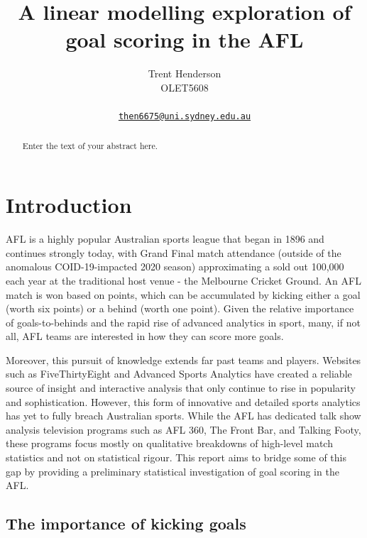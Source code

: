 \documentclass{article}
\title{A linear modelling exploration of goal scoring in the AFL}
\author{
    Trent Henderson
   \\
    OLET5608 \\
   \\
  \texttt{\href{mailto:then6675@uni.sydney.edu.au}{\nolinkurl{then6675@uni.sydney.edu.au}}} \\
  }
\begin{document}
\maketitle

\def\tightlist{}


\begin{abstract}
Enter the text of your abstract here.
\end{abstract}


\setlength{\abovedisplayskip}{-15pt}
\setlength{\belowdisplayskip}{0pt}
\setlength{\abovedisplayshortskip}{0pt}
\setlength{\belowdisplayshortskip}{0pt}

\hypertarget{introduction}{%
\section{Introduction}\label{introduction}}

AFL is a highly popular Australian sports league that began in 1896 and
continues strongly today, with Grand Final match attendance (outside of
the anomalous COID-19-impacted 2020 season) approximating a sold out
100,000 each year at the traditional host venue - the Melbourne Cricket
Ground. An AFL match is won based on points, which can be accumulated by
kicking either a goal (worth six points) or a behind (worth one point).
Given the relative importance of goals-to-behinds and the rapid rise of
advanced analytics in sport, many, if not all, AFL teams are interested
in how they can score more goals.

Moreover, this pursuit of knowledge extends far past teams and players.
Websites such as FiveThirtyEight and Advanced Sports Analytics have
created a reliable source of insight and interactive analysis that only
continue to rise in popularity and sophistication. However, this form of
innovative and detailed sports analytics has yet to fully breach
Australian sports. While the AFL has dedicated talk show analysis
television programs such as AFL 360, The Front Bar, and Talking Footy,
these programs focus mostly on qualitative breakdowns of high-level
match statistics and not on statistical rigour. This report aims to
bridge some of this gap by providing a preliminary statistical
investigation of goal scoring in the AFL.

\hypertarget{the-importance-of-kicking-goals}{%
\subsection{The importance of kicking
goals}\label{the-importance-of-kicking-goals}}
\end{document}
